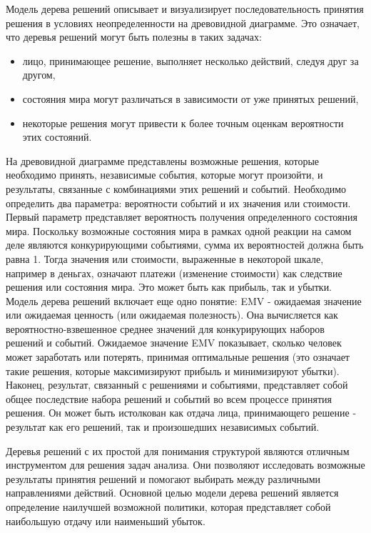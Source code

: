 Модель дерева решений описывает и визуализирует последовательность принятия решения в условиях неопределенности на древовидной диаграмме. Это означает, что деревья решений могут быть полезны в таких задачах:
\begin{itemize}
    \item лицо, принимающее решение, выполняет несколько действий, следуя друг за другом,
    \item состояния мира могут различаться в зависимости от уже принятых решений,
    \item некоторые решения могут привести к более точным оценкам вероятности этих состояний.
\end{itemize}

На древовидной диаграмме представлены возможные решения, которые необходимо принять, независимые события, которые могут произойти, и результаты, связанные с комбинациями этих решений и событий. Необходимо определить два параметра: вероятности событий и их значения или стоимости. Первый параметр представляет вероятность получения определенного состояния мира. Поскольку возможные состояния мира в рамках одной реакции на самом деле являются конкурирующими событиями, сумма их вероятностей должна быть равна 1. 
Тогда значения или стоимости, выраженные в некоторой шкале, например в деньгах, означают платежи (изменение стоимости) как следствие решения или состояния мира. 
Это может быть как прибыль, так и убытки. Модель дерева решений включает еще одно понятие: EMV - ожидаемая значение или ожидаемая ценность (или ожидаемая полезность). Она вычисляется как вероятностно-взвешенное среднее значений для конкурирующих наборов решений и событий. Ожидаемое значение EMV показывает, сколько человек может заработать или потерять, принимая оптимальные решения (это означает такие решения, которые максимизируют прибыль и минимизируют убытки). Наконец, результат, связанный с решениями и событиями, представляет собой общее последствие набора решений и событий во всем процессе принятия решения. Он может быть истолкован как отдача лица, принимающего решение - результат как его решений, так и произошедших независимых событий.

Деревья решений с их простой для понимания структурой являются отличным инструментом для решения задач анализа. Они позволяют исследовать возможные результаты принятия решений и помогают выбирать между различными направлениями действий. Основной целью модели дерева решений является определение наилучшей возможной политики, которая представляет собой наибольшую отдачу или наименьший убыток.


